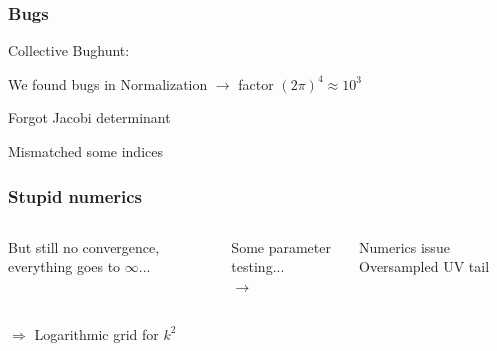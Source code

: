 \begin{frame}\frametitle{Bugs}
  {\Large Collective Bughunt:}


  {\small

    \pause
    \vspace{3mm}
    We found bugs in Normalization $\rightarrow$ factor $(2\pi)^4 \approx 10^3$

    \pause
    \vspace{3mm}
    Forgot Jacobi determinant

    \pause
    \vspace{3mm}
    Mismatched some indices
  }
\end{frame}

\begin{frame}\frametitle{Stupid numerics}
  \begin{columns}
    \centering
    \begin{column}{0.4\linewidth}
      \begin{block}{}
        \vspace{-0.cm}
        But still no convergence, everything goes to $\infty$...
      \end{block}
    \end{column}
    \pause
    \begin{column}{0.2\linewidth}
      \centering
      \tiny
      Some parameter testing...\\
      $\rightarrow$
    \end{column}
    \pause
    \begin{column}{0.4\linewidth}
      \begin{block}{Numerics issue}
        \vspace{-0.cm}
          Oversampled UV tail
      \end{block}
    \end{column}
  \end{columns}
  \pause
  \vspace{1cm}
  \centering
  $\Rightarrow$ Logarithmic grid for $k^2$
\end{frame}

